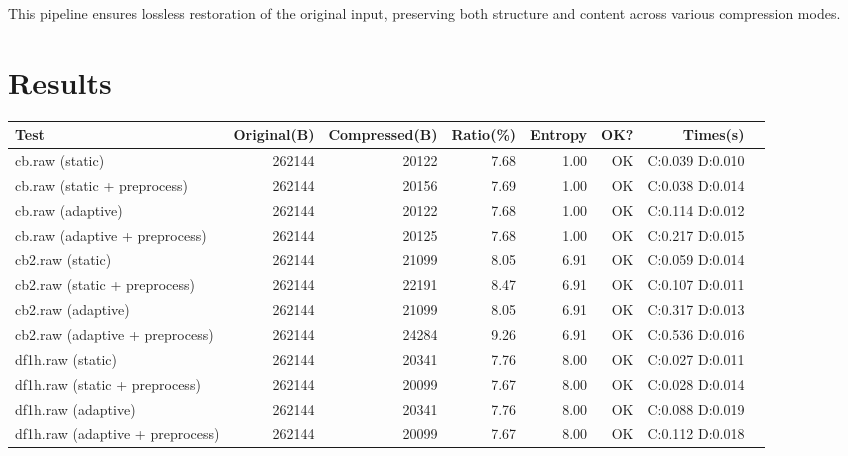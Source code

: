 \documentclass[a4paper,12pt]{article}
\begin{document}
    This pipeline ensures lossless restoration of the original input, preserving both structure and content across various compression modes.

    \section{Results}
    {
        \scriptsize
        \begin{tabular}{lrrrrrrr}
            \hline
            Test                               & Original(B) & Compressed(B) & Ratio(\%) & Entropy & OK? & Times(s)        \\
            \hline
            cb.raw (static)                    & 262144      & 20122         & 7.68      & 1.00    & OK  & C:0.039 D:0.010 \\
            cb.raw (static + preprocess)       & 262144      & 20156         & 7.69      & 1.00    & OK  & C:0.038 D:0.014 \\
            cb.raw (adaptive)                  & 262144      & 20122         & 7.68      & 1.00    & OK  & C:0.114 D:0.012 \\
            cb.raw (adaptive + preprocess)     & 262144      & 20125         & 7.68      & 1.00    & OK  & C:0.217 D:0.015 \\
            cb2.raw (static)                   & 262144      & 21099         & 8.05      & 6.91    & OK  & C:0.059 D:0.014 \\
            cb2.raw (static + preprocess)      & 262144      & 22191         & 8.47      & 6.91    & OK  & C:0.107 D:0.011 \\
            cb2.raw (adaptive)                 & 262144      & 21099         & 8.05      & 6.91    & OK  & C:0.317 D:0.013 \\
            cb2.raw (adaptive + preprocess)    & 262144      & 24284         & 9.26      & 6.91    & OK  & C:0.536 D:0.016 \\
            df1h.raw (static)                  & 262144      & 20341         & 7.76      & 8.00    & OK  & C:0.027 D:0.011 \\
            df1h.raw (static + preprocess)     & 262144      & 20099         & 7.67      & 8.00    & OK  & C:0.028 D:0.014 \\
            df1h.raw (adaptive)                & 262144      & 20341         & 7.76      & 8.00    & OK  & C:0.088 D:0.019 \\
            df1h.raw (adaptive + preprocess)   & 262144      & 20099         & 7.67      & 8.00    & OK  & C:0.112 D:0.018 \\

\end{tabular}}
\end{document}

